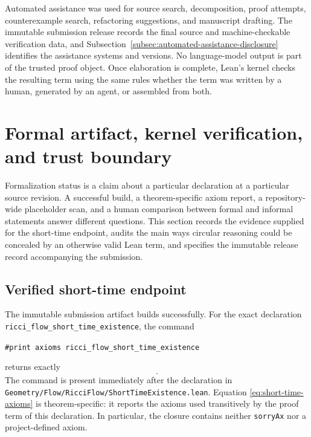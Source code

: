 \documentclass[11pt]{article}
\theoremstyle{plain}
\theoremstyle{definition}
\theoremstyle{remark}
\newcommand{\leanref}[1]{\nolinkurl{#1}}
\newcommand{\leanfile}[1]{\nolinkurl{#1}}
\newcommand{\rffile}[1]{\leanfile{#1}}
\begin{document}
Automated assistance was used for source search, decomposition, proof attempts,
counterexample search, refactoring suggestions, and manuscript drafting.  The
immutable submission release records the final source and machine-checkable
verification data, and
Subsection~\ref{subsec:automated-assistance-disclosure} identifies the
assistance systems and versions.  No
language-model output is part of the trusted proof object.  Once elaboration is
complete, Lean's kernel checks the resulting term using the same rules whether
the term was written by a human, generated by an agent, or assembled from both.


\section{Formal artifact, kernel verification, and trust boundary}
\label{sec:artifact-verification}

Formalization status is a claim about a particular declaration at a particular
source revision.  A successful build, a theorem-specific axiom report, a
repository-wide placeholder scan, and a human comparison between formal and
informal statements answer different questions.  This section records the
evidence supplied for the short-time endpoint, audits the main
ways circular reasoning could be concealed by an otherwise valid Lean term,
and specifies the immutable release record accompanying the submission.

\subsection{Verified short-time endpoint}
\label{subsec:verified-short-time-endpoint}

The immutable submission artifact builds successfully.  For the exact declaration
\leanref{ricci_flow_short_time_existence}, the command
\begin{center}
  \texttt{\#print axioms ricci\_flow\_short\_time\_existence}
\end{center}
returns exactly
\begin{equation}
  [\texttt{propext},\ \texttt{Classical.choice},\ \texttt{Quot.sound}].
  \label{eq:short-time-axioms}
\end{equation}
The command is present immediately after the declaration in
\rffile{Geometry/Flow/RicciFlow/ShortTimeExistence.lean}.  Equation
\eqref{eq:short-time-axioms} is theorem-specific: it reports the axioms used
transitively by the proof term of this declaration.  In particular, the
closure contains neither \texttt{sorryAx} nor a project-defined axiom.
\end{document}
